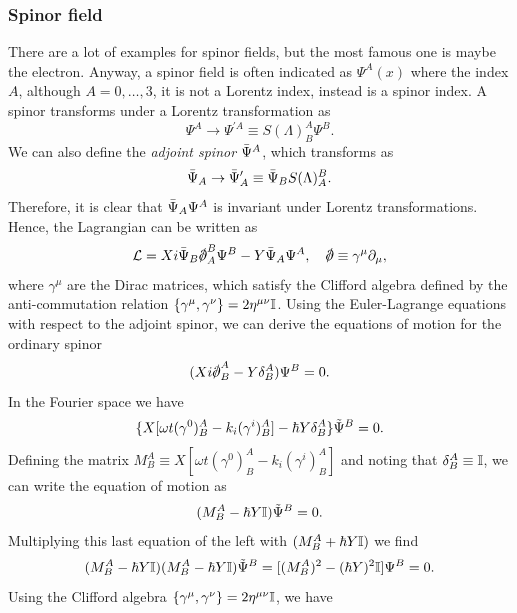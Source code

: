 \subsubsection{Spinor field}
There are a lot of examples for spinor fields, but the most famous one is maybe the electron. Anyway, a spinor field is often indicated as $\Psi^A(x)$ where the index $A$, although $A = 0,\dots,3$, it is not a Lorentz index, instead is a spinor index. A spinor transforms under a Lorentz transformation as 
\begin{equation}
    \Psi^A \to \Psi^{\prime A} \equiv S(\Lambda)^A_B\Psi^B.
\end{equation}
We can also define the \emph{adjoint spinor} $\bar{\Psi}^A$, which transforms as 
\begin{equation}
    \bar{\Psi}_A \to \bar{\Psi}^{\prime}_A \equiv \bar{\Psi}_BS(\Lambda)^B_A.
\end{equation}
Therefore, it is clear that $\bar{\Psi}_A\Psi^A$ is invariant under Lorentz transformations. Hence, the Lagrangian can be written as 
\begin{equation}
    \Lag = Xi\b{\Psi}_B\sl{\p}_A^B\Psi^B - Y\b{\Psi}_A\Psi^A,\quad \sl{\p} \equiv \gamma^\mu\p_\mu,
\end{equation}
where $\gamma^\mu$ are the Dirac matrices, which satisfy the Clifford algebra defined by the anti-commutation relation $\{\gamma^\mu,\gamma^\nu\} = 2\eta^{\mu\nu}\mathbb{I}$. Using the Euler-Lagrange equations with respect to the adjoint spinor, we can derive the equations of motion for the ordinary spinor 
\begin{equation}
    (Xi\sl{\p}^A_B- Y\delta^A_B)\Psi^B = 0.
\end{equation}
In the Fourier space we have 
\begin{equation}
    \{X[\omega t(\gamma^0)^A_B - k_i(\gamma^i)^A_B] - \hbar Y\delta^A_B\}\tilde{\Psi}^B = 0.
\end{equation}
Defining the matrix $M^A_B \equiv X[\omega t(\gamma^0)^A_B - k_i(\gamma^i)^A_B]$ and noting that $\delta^A_B \equiv \mathbb{I}$,  we can write the equation of motion as 
\begin{equation}
    (M_B^A - \hbar Y\mathbb{I})\tilde{\Psi}^B = 0.
\end{equation}
Multiplying this last equation of the left with $(M_B^A + \hbar Y\mathbb{I})$ we find 
\begin{equation}
    (M_B^A - \hbar Y\mathbb{I})(M_B^A - \hbar Y\mathbb{I})\tilde{\Psi}^B = [(M_B^A)^2 - (\hbar Y)^2\mathbb{I}]\Psi^B = 0.
\end{equation}
Using the Clifford algebra $\{\gamma^\mu,\gamma^\nu\} = 2\eta^{\mu\nu}\mathbb{I}$, we have 
